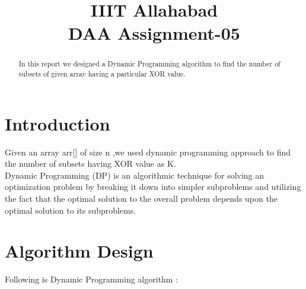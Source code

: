 \documentclass[conference]{IEEEtran}
\begin{document}
\title{IIIT Allahabad\\DAA Assignment-05\\
}

\author{
\and
{}
\and
{}
}

\maketitle

\begin{abstract}
In this report we designed a Dynamic Programming algorithm to find the number of subsets of given array having a particular XOR value.

\end{abstract}

\section{Introduction}
Given an array arr[] of size n ,we used dynamic programming approach to find the number of subsets having XOR value as K.\\
Dynamic Programming (DP) is an algorithmic technique for solving an optimization problem by breaking it down into simpler subproblems and utilizing the fact that the optimal solution to the overall problem depends upon the optimal solution to its subproblems.


\section{Algorithm Design}
Following is Dynamic Programming algorithm :
\end{document}
